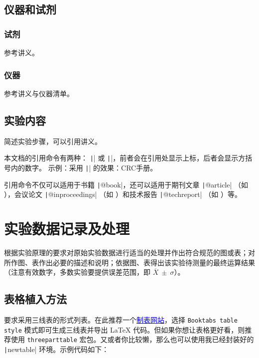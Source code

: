 \documentclass[a4paper,12pt]{article}
\begin{document}
\subsection{仪器和试剂}
\subsubsection{试剂}
参考讲义。

\subsubsection{仪器}
参考讲义与仪器清单。

\subsection{实验内容}
简述实验步骤，可以引用讲义。

本文档的引用命令有两种： \texttt|\supercite{}| 或 \texttt|\cite{}|，前者会在引用处显示上标，后者会显示方括号内的数字。
示例：采用 \texttt|\supercite{haynes2016crc}| 的效果：CRC手册\supercite{haynes2016crc}。

引用命令不仅可以适用于书籍 \texttt|@book|，还可以适用于期刊文章 \texttt|@article| （如 \cite{example_article}），会议论文 \texttt|@inproceedings| （如 \cite{example_inproceedings}）和技术报告 \texttt|@techreport| （如 \cite{example_techreport}）等。

\vspace{1cm}
\section{实验数据记录及处理}
\label{sec:data}

根据实验原理的要求对原始实验数据进行适当的处理并作出符合规范的图或表；对所作图、表作出必要的描述和说明；依据图、表得出该实验待测量的最终运算结果（注意有效数字，多数实验要提供误差范围，即 $\overline{X}\ \pm\ \sigma$）。

\subsection{表格植入方法}

要求采用三线表的形式列表。在此推荐一个\href{https://www.tablesgenerator.com/}{\textcolor{blue}{制表网站}}，选择 \texttt{Booktabs table style} 模式即可生成三线表并导出 \LaTeX{} 代码。但如果你想让表格更好看，则推荐使用 \texttt{threeparttable} 宏包。又或者你比较懒，那么也可以使用我已经封装好的 \texttt|newtable| 环境。示例代码如下：
\end{document}
